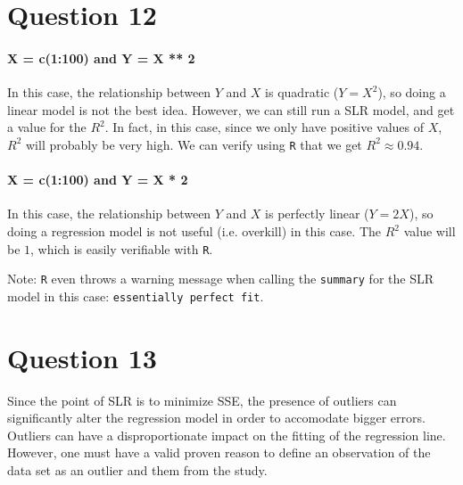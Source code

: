 \documentclass[]{article}
\let\oldparagraph\paragraph
\renewcommand{\paragraph}[1]{\oldparagraph{#1}\mbox{}}
\begin{document}
\section*{Question 12}




\paragraph{X = c(1:100) and Y = X ** 2}
In this case, the relationship between $Y$ and $X$ is quadratic ($Y = X^2$), so doing a linear model is not the best idea. However, we can still run a SLR model, and get a value for the $R^2$. In fact, in this case, since we only have positive values of $X$, $R^2$ will probably be very high. We can verify using \texttt{R} that we get $R^2 \approx 0.94$.

\paragraph{X = c(1:100) and Y = X * 2}
In this case, the relationship between $Y$ and $X$ is perfectly linear ($Y = 2X$), so doing a regression model is not useful (i.e. overkill) in this case. The $R^2$ value will be $1$, which is easily verifiable with \texttt{R}.

Note: \texttt{R} even throws a warning message when calling the \texttt{summary} for the SLR model in this case: \texttt{essentially perfect fit}.

\section*{Question 13}

Since the point of SLR is to minimize SSE, the presence of outliers can significantly alter the regression model in order to accomodate bigger errors. Outliers can have a disproportionate impact on the fitting of the regression line. However, one must have a valid proven reason to define an observation of the data set as an outlier and them from the study.
\end{document}
